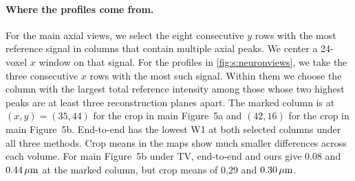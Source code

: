\paragraph{Where the profiles come from.}
For the main axial views, we select the eight consecutive $y$ rows with the most reference signal in columns that contain multiple axial peaks. We center a 24-voxel $x$ window on that signal. For the profiles in \cref{fig:s:neuronviews}, we take the three consecutive $x$ rows with the most such signal. Within them we choose the column with the largest total reference intensity among those whose two highest peaks are at least three reconstruction planes apart. The marked column is at $(x,y)=(35,44)$ for the crop in main Figure~5a and $(42,16)$ for the crop in main Figure~5b. End-to-end has the lowest W1 at both selected columns under all three methods. Crop means in the maps show much smaller differences across each volume. For main Figure~5b under TV, end-to-end and ours give $0.08$ and $0.44\,\mu\mathrm{m}$ at the marked column, but crop means of $0.29$ and $0.30\,\mu\mathrm{m}$.

\clearpage
\twocolumn
